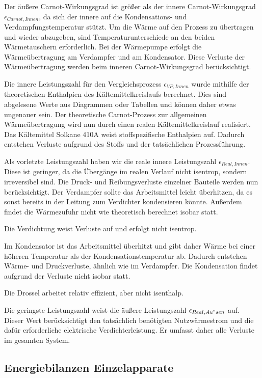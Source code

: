 Der äußere Carnot-Wirkungsgrad ist größer als der innere Carnot-Wirkungsgrad $\epsilon_{Carnot,Innen}$, da sich der innere auf die Kondensations- und Verdampfungstemperatur stützt. 
Um die Wärme auf den Prozess zu übertragen und wieder abzugeben, sind Temperaturunterschiede an den beiden Wärmetauschern erforderlich. 
Bei der Wärmepumpe erfolgt die Wärmeübertragung am Verdampfer und am Kondensator. 
Diese Verluste der Wärmeübertragung werden beim inneren Carnot-Wirkungsgrad berücksichtigt.

Die innere Leistungszahl für den Vergleichsprozess $\epsilon_{VP,Innen}$ wurde mithilfe der theoretischen Enthalpien des Kältemittelkreislaufs berechnet.
Dies sind abgelesene Werte aus Diagrammen oder Tabellen und können daher etwas ungenauer sein. 
Der theoretische Carnot-Prozess zur allgemeinen Wärmeübertragung wird nun durch einen realen Kältemittelkreislauf realisiert. 
Das Kältemittel Solkane 410A weist stoffspezifische Enthalpien auf. 
Dadurch entstehen Verluste aufgrund des Stoffs und der tatsächlichen Prozessführung.

Als vorletzte Leistungszahl haben wir die reale innere Leistungszahl $\epsilon_{Real,Innen}$.
Diese ist geringer, da die Übergänge im realen Verlauf nicht isentrop, sondern irreversibel sind. 
Die Druck- und Reibungsverluste einzelner Bauteile werden nun berücksichtigt. 
Der Verdampfer sollte das Arbeitsmittel leicht überhitzen, da es sonst bereits in der Leitung zum Verdichter kondensieren könnte. 
Außerdem findet die Wärmezufuhr nicht wie theoretisch berechnet isobar statt.

Die Verdichtung weist Verluste auf und erfolgt nicht isentrop.

Im Kondensator ist das Arbeitsmittel überhitzt und gibt daher Wärme bei einer höheren Temperatur als der Kondensationstemperatur ab. 
Dadurch entstehen Wärme- und Druckverluste, ähnlich wie im Verdampfer. 
Die Kondensation findet aufgrund der Verluste nicht isobar statt.

Die Drossel arbeitet relativ effizient, aber nicht isenthalp.

Die geringste Leistungszahl weist die äußere Leistungszahl $\epsilon_{Real,Au"sen}$ auf. 
Dieser Wert berücksichtigt den tatsächlich benötigten Nutzwärmestrom und die dafür erforderliche elektrische Verdichterleistung. 
Er umfasst daher alle Verluste im gesamten System.


\subsection{Energiebilanzen Einzelapparate}
\label{subsec:Massenstrom}
